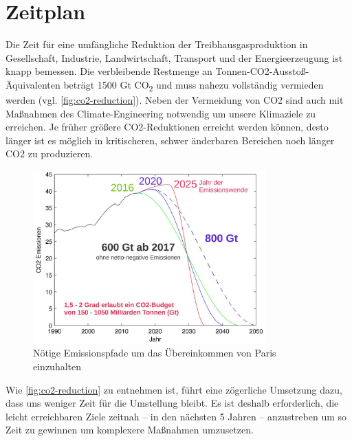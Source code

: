 \section{Zeitplan}

Die Zeit für eine umfängliche Reduktion der Treibhausgasproduktion in Gesellschaft, Industrie, Landwirtschaft, Transport und der Energieerzeugung ist knapp bemessen.
Die verbleibende Restmenge an Tonnen-CO2-Ausstoß-Äqui\-valenten beträgt 1500 Gt CO\textsubscript{2} und muss nahezu vollständig vermieden werden (vgl. \autoref{fig:co2-reduction}).
Neben der Vermeidung von CO2 sind auch mit Maßnahmen des Climate-Engineering notwendig um unsere Klimaziele zu erreichen.
Je früher größere CO2-Reduktionen erreicht werden können, desto länger ist es möglich in kritischeren, schwer änderbaren Bereichen noch länger CO2 zu produzieren.

\begin{figure}[!htb]
	\centering
	\includegraphics[width=0.8\textwidth]{emission-paths-for-reaching-the-paris-agreement.jpg}
	\caption{Nötige Emissionspfade um das Übereinkommen von Paris einzuhalten}
	\label{fig:co2-reduction}
\end{figure}

Wie \autoref{fig:co2-reduction} zu entnehmen ist, führt eine zögerliche Umsetzung dazu, dass uns weniger Zeit für die Umstellung bleibt.
Es ist deshalb erforderlich, die leicht erreichbaren Ziele zeitnah -- in den nächsten 5 Jahren -- anzustreben um so Zeit zu gewinnen um komplexere Maßnahmen umzusetzen.





